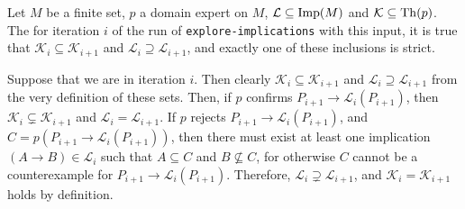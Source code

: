 \begin{Proposition}
  \label{prop:technicalities-about-explore-implications}
  Let $M$ be a finite set, $p$ a domain expert on $M$, $\mathcal{L} \subseteq \operatorname{Imp}(M)$ and
  $\mathcal{K} \subseteq \operatorname{Th}(p)$.  The for iteration $i$ of the run of
  \lstinline{explore-implications} with this input, it is true that $\mathcal{K}_i
  \subseteq \mathcal{K}_{i+1}$ and $\mathcal{L}_i \supseteq \mathcal{L}_{i+1}$, and
  exactly one of these inclusions is strict.
\end{Proposition}
\begin{Proof}
  Suppose that we are in iteration $i$.  Then clearly $\mathcal{K}_i \subseteq
  \mathcal{K}_{i+1}$ and $\mathcal{L}_i \supseteq \mathcal{L}_{i+1}$ from the very
  definition of these sets.  Then, if $p$ confirms $P_{i+1} \to \mathcal{L}_i(P_{i+1})$,
  then $\mathcal{K}_i \subsetneq \mathcal{K}_{i+1}$ and $\mathcal{L}_i =
  \mathcal{L}_{i+1}$.  If $p$ rejects $P_{i+1} \to \mathcal{L}_i(P_{i+1})$, and $C =
  p(P_{i+1} \to \mathcal{L}_i(P_{i+1}))$, then there must exist at least one implication
  $(A \to B) \in \mathcal{L}_i$ such that $A \subseteq C$ and $B \not\subseteq C$, for
  otherwise $C$ cannot be a counterexample for $P_{i+1} \to \mathcal{L}_i(P_{i+1})$.
  Therefore, $\mathcal{L}_i \supsetneq \mathcal{L}_{i+1}$, and $\mathcal{K}_i =
  \mathcal{K}_{i+1}$ holds by definition.
\end{Proof}

